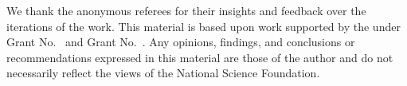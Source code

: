 \documentclass[acmsmall,screen]{acmart}\settopmatter{}
\theoremstyle{plain}
\begin{document}


\maketitle











\begin{acks}                            %
  We thank the anonymous referees for their insights and feedback over
  the iterations of the work.
  This material is based upon work supported by the
   under Grant
  No.~ and Grant
  No.~.  Any opinions, findings, and
  conclusions or recommendations expressed in this material are those
  of the author and do not necessarily reflect the views of the
  National Science Foundation.
\end{acks}

\newpage


\end{document}
